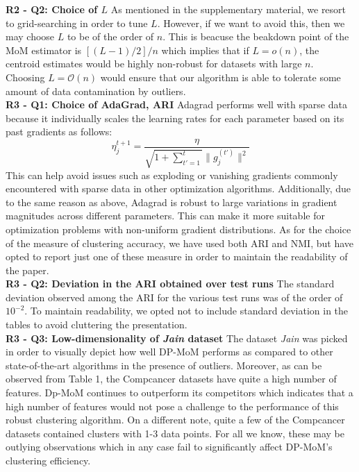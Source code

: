 \documentclass{article}
\begin{document}
\textbf{R2 - Q2: Choice of $L$} As mentioned in the supplementary material, we resort to grid-searching in order to tune $L$. However, if we want to avoid this, then we may choose $L$ to be of the order of $n$. This is beacuse the beakdown point of the MoM estimator is $[(L-1)/2]/n$ which implies that if $L=o(n)$, the centroid estimates would be highly non-robust for datasets with large $n$. Choosing $L=\mathcal{O}(n)$ would ensure that our algorithm is able to tolerate some amount of data contamination by outliers. \\
\textbf{R3 - Q1: Choice of AdaGrad, ARI} Adagrad performs well with sparse data because it individually scales the learning rates for each parameter based on its past gradients as follows: \[\eta_j^{t+1}=\frac{\eta}{\sqrt{1+\sum_{t'=1}^t} \|g_j^{(t')}\|^2}\]
This can help avoid issues such as exploding or vanishing gradients commonly encountered with sparse data in other optimization algorithms. Additionally, due to the same reason as above, Adagrad is robust to large variations in gradient magnitudes across different parameters. This can make it more suitable for optimization problems with non-uniform gradient distributions. As for the choice of the measure of clustering accuracy, we have used both ARI and NMI, but have opted to report just one of these measure in order to maintain the readability of the paper.
\\
\textbf{R3 - Q2: Deviation in the ARI obtained over test runs} 
The standard deviation observed among the ARI for the various test runs was of the order of $10^{-2}$. To maintain readability, we opted not to include standard deviation in the tables to avoid cluttering the presentation.\\
\textbf{R3 - Q3: Low-dimensionality of \textit{Jain} dataset} The dataset \textit{Jain} was picked in order to visually depict how well DP-MoM performs as compared to other state-of-the-art algorithms in the presence of outliers. Moreover, as can be observed from Table 1, the Compcancer datasets have quite a high number of features. Dp-MoM continues to outperform its competitors which indicates that a high number of features would not pose a challenge to the performance of this robust clustering algorithm. On a different note, quite a few of the Compcancer datasets contained clusters with 1-3 data points. For all we know, these may be outlying observations which in any case fail to significantly affect DP-MoM's clustering efficiency.\\
\end{document}
